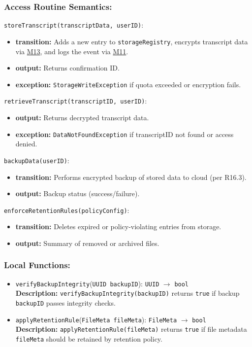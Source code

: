 \documentclass[12pt, titlepage]{article}
\begin{document}
\subsubsection{Access Routine Semantics:}

\noindent\texttt{storeTranscript(transcriptData, userID)}:
\begin{itemize}
  \item \textbf{transition:} Adds a new entry to \texttt{storageRegistry}, encrypts transcript data via \hyperref[M13]{M13}, and logs the event via \hyperref[M11]{M11}.
  \item \textbf{output:} Returns confirmation ID.
  \item \textbf{exception:} \texttt{StorageWriteException} if quota exceeded or encryption fails.
\end{itemize}

\noindent\texttt{retrieveTranscript(transcriptID, userID)}:
\begin{itemize}
  \item \textbf{output:} Returns decrypted transcript data.
  \item \textbf{exception:} \texttt{DataNotFoundException} if transcriptID not found or access denied.
\end{itemize}

\noindent\texttt{backupData(userID)}:
\begin{itemize}
  \item \textbf{transition:} Performs encrypted backup of stored data to cloud (per R16.3).
  \item \textbf{output:} Backup status (success/failure).
\end{itemize}

\noindent\texttt{enforceRetentionRules(policyConfig)}:
\begin{itemize}
  \item \textbf{transition:} Deletes expired or policy-violating entries from storage.
  \item \textbf{output:} Summary of removed or archived files.
\end{itemize}

\subsubsection{Local Functions:}
\begin{itemize}
  \item \texttt{verifyBackupIntegrity}(\texttt{UUID backupID}): \texttt{UUID} $\rightarrow$ \texttt{bool} \\
  \textbf{Description:} \texttt{verifyBackupIntegrity(backupID)} returns \texttt{true} if backup \texttt{backupID} passes integrity checks.

  \item \texttt{applyRetentionRule}(\texttt{FileMeta fileMeta}): \texttt{FileMeta} $\rightarrow$ \texttt{bool} \\
  \textbf{Description:} \texttt{applyRetentionRule(fileMeta)} returns \texttt{true} if file metadata \texttt{fileMeta} should be retained by retention policy.
\end{itemize}
\end{document}

